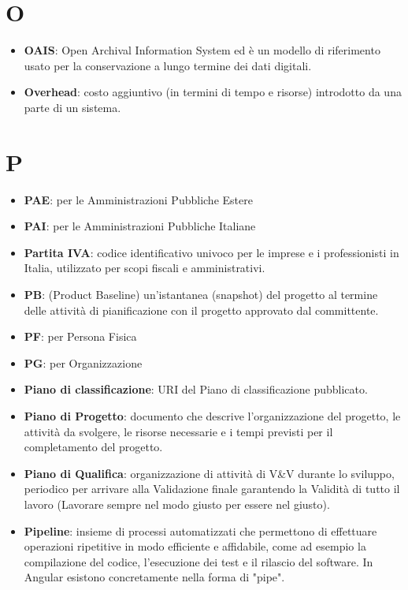 \documentclass[a4paper,12pt]{article}
\begin{document}
\section{O}
\begin{itemize}
    \item \textbf{OAIS}: Open Archival Information System ed è un modello di riferimento usato per la conservazione a lungo termine dei dati digitali.
    \item \textbf{Overhead}: costo aggiuntivo (in termini di tempo e risorse) introdotto da una parte di un sistema.
\end{itemize}
\section{P}
\begin{itemize}
    \item \textbf{PAE}: per le Amministrazioni Pubbliche Estere
    \item \textbf{PAI}: per le Amministrazioni Pubbliche Italiane
    \item \textbf{Partita IVA}: codice identificativo univoco per le imprese e i professionisti in Italia, utilizzato per scopi fiscali e amministrativi.
    \item \textbf{PB}: (Product Baseline) un'istantanea (snapshot) del progetto al termine delle attività di pianificazione con il progetto approvato dal committente.
    \item \textbf{PF}: per Persona Fisica
    \item \textbf{PG}: per Organizzazione
    \item \textbf{Piano di classificazione}: URI del Piano di classificazione pubblicato.
    \item \textbf{Piano di Progetto}: documento che descrive l'organizzazione del progetto, le attività da svolgere, le risorse necessarie e i tempi previsti per il completamento del progetto. 
    \item \textbf{Piano di Qualifica}: organizzazione di attività di V\&V durante lo sviluppo, periodico per arrivare alla Validazione finale garantendo la Validità di tutto il lavoro (Lavorare sempre nel modo giusto per essere nel giusto).
    \item \textbf{Pipeline}: insieme di processi automatizzati che permettono di effettuare operazioni ripetitive in modo efficiente e affidabile, come ad esempio la compilazione del codice, l'esecuzione dei test e il rilascio del software. In Angular esistono concretamente nella forma di "pipe".

\end{itemize}
\end{document}
